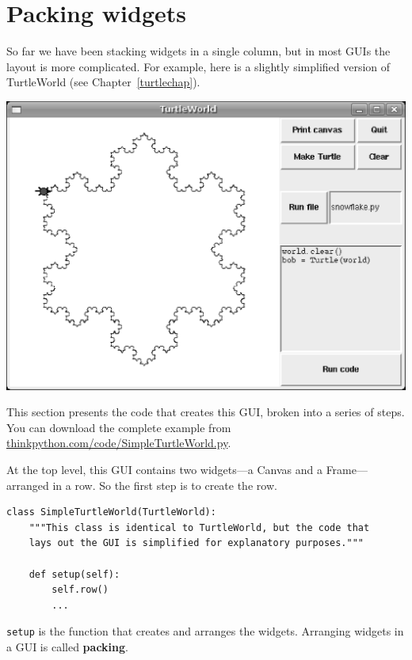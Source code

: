 \documentclass[10pt]{book}
\begin{document}
\section{Packing widgets}

So far we have been stacking widgets in a single column, but in most
GUIs the layout is more complicated.  For example, here is a slightly
simplified version of TurtleWorld (see
Chapter~\ref{turtlechap}).

\beforefig
\centerline{
\includegraphics[width=1.0\textwidth]{figs/TurtleWorld.eps}
}
\afterfig

This section presents the code that creates this GUI, broken into a
series of steps.  You can download the complete example
from \url{thinkpython.com/code/SimpleTurtleWorld.py}.

At the top level, this GUI contains two widgets---a Canvas and a
Frame---arranged in a row.  So the first step is to create the row.


\beforeverb
\begin{verbatim}
class SimpleTurtleWorld(TurtleWorld):
    """This class is identical to TurtleWorld, but the code that
    lays out the GUI is simplified for explanatory purposes."""

    def setup(self):
        self.row()
        ...
\end{verbatim}
\afterverb
%
{\tt setup} is the function that creates and arranges the widgets.
Arranging widgets in a GUI is called {\bf packing}.

\end{document}
